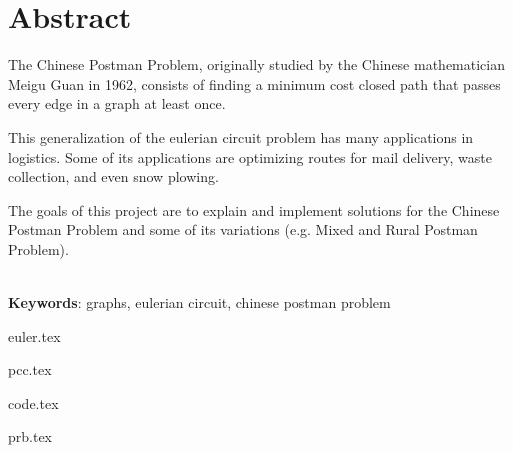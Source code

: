 \documentclass[12pt,twoside,english,brazilian]{book}
\begin{document}
\chapter*{Abstract}


The Chinese Postman Problem, originally studied by the Chinese mathematician Meigu Guan in 1962, consists of finding a minimum cost closed path that passes every edge in a graph at least once.

This generalization of the eulerian circuit problem has many applications in logistics. Some of its applications are optimizing routes for mail delivery, waste collection, and even snow plowing.

The goals of this project are to explain and implement solutions for the Chinese Postman Problem and some of its variations (e.g. Mixed and Rural Postman Problem).


\noindent \\ \textbf{Keywords}: graphs, eulerian circuit, chinese postman problem



\mainmatter


\singlespacing

\newpage
\tableofcontents
\newpage

{euler.tex}

{pcc.tex}

{code.tex}

{prb.tex}

    \iffalse
        \section{Anotações}

        \begin{itemize}
            \item Todo mixed CPP pode ser transformado em um WPP.
        \end{itemize}

    \fi

	\medskip

    \newpage
    \printbibliography
 
\end{document}
